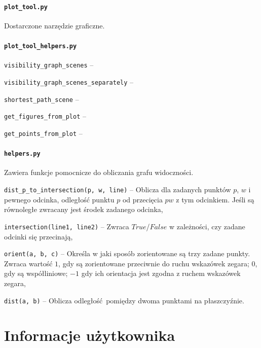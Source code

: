 \documentclass[12pt]{article}
\let\tempone\itemize
\let\temptwo\enditemize
\renewenvironment{itemize}{\tempone\setlength{\itemsep}{0cm}}{\temptwo}
\begin{document}
	\paragraph{\lstinline|plot_tool.py|}
		Dostarczone narzędzie graficzne.
	
	\paragraph{\lstinline|plot_tool_helpers.py|}
		\begin{itemize}
			\item \lstinline|visibility_graph_scenes| -- 
			\item \lstinline|visibility_graph_scenes_separately| -- 
			\item \lstinline|shortest_path_scene| -- 
			\item \lstinline|get_figures_from_plot| -- 
			\item \lstinline|get_points_from_plot| -- 
		\end{itemize}
	
	\paragraph{\lstinline|helpers.py|}
		Zawiera funkcje pomocnicze do obliczania grafu widoczności.
		\begin{itemize}
			\item \lstinline|dist_p_to_intersection(p, w, line)| -- Oblicza dla zadanych punktów $ p $, $ w $ i pewnego odcinka, odległość punktu $ p $ od przecięcia $ pw $ z tym odcinkiem. Jeśli są równoległe zwracany jest środek zadanego odcinka,\\
			\item \lstinline|intersection(line1, line2)| -- Zwraca $ True $/$ False $ w zależności, czy zadane odcinki się przecinają,\\
			\item \lstinline|orient(a, b, c)| -- Określa w jaki sposób zorientowane są trzy zadane punkty. Zwraca wartość $ 1 $, gdy są zorientowane przeciwnie do ruchu wskazówek zegara; $ 0 $, gdy są współliniowe; $ -1 $ gdy ich orientacja jest zgodna z ruchem wskazówek zegara,\\
			\item \lstinline|dist(a, b)| -- Oblicza odległość pomiędzy dwoma punktami na płaszczyźnie.
		\end{itemize}

	\section{Informacje użytkownika}
	
\end{document}
